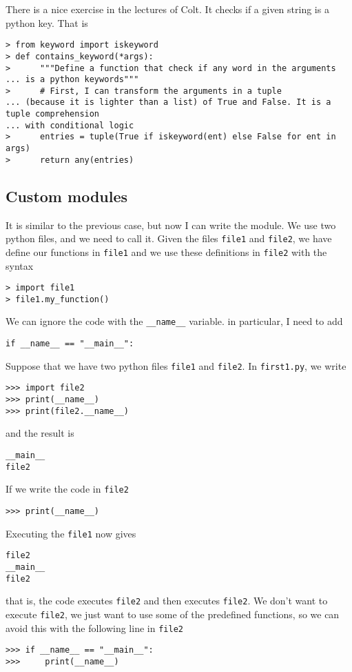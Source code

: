 There is a nice exercise in the lectures of Colt. It checks if a given string is a python key. That is
\begin{verbatim}
> from keyword import iskeyword
> def contains_keyword(*args):
>      """Define a function that check if any word in the arguments 
... is a python keywords"""
>      # First, I can transform the arguments in a tuple 
... (because it is lighter than a list) of True and False. It is a tuple comprehension 
... with conditional logic
>      entries = tuple(True if iskeyword(ent) else False for ent in args)
>      return any(entries)
\end{verbatim}


\subsection{Custom modules}

It is similar to the previous case, but now I can write the module. We use two python files, and we need to call it. Given the files \verb|file1| and \verb|file2|, we have define our functions in \verb|file1| and we use these definitions in \verb|file2| with the syntax 
\begin{verbatim}
> import file1
> file1.my_function()
\end{verbatim}

We can ignore the code with the \verb|__name__| variable. in particular, I need to add 
\begin{verbatim}
if __name__ == "__main__":
\end{verbatim}
Suppose that we have two python files \verb|file1| and \verb|file2|. In \verb|first1.py|, we write
\begin{verbatim}
>>> import file2
>>> print(__name__)
>>> print(file2.__name__)
\end{verbatim}
and the result is 
\begin{verbatim}
__main__
file2
\end{verbatim}

If we write the code in \verb|file2|
\begin{verbatim}
>>> print(__name__)
\end{verbatim}
Executing the \verb|file1| now gives
\begin{verbatim}
file2
__main__
file2
\end{verbatim}
that is, the code executes \verb|file2| and then executes \verb|file2|. We don't want to execute \verb|file2|, we just want to use some of the predefined functions, so we can avoid this with the following line in \verb|file2|
\begin{verbatim}
>>> if __name__ == "__main__":
>>>     print(__name__)
\end{verbatim}

